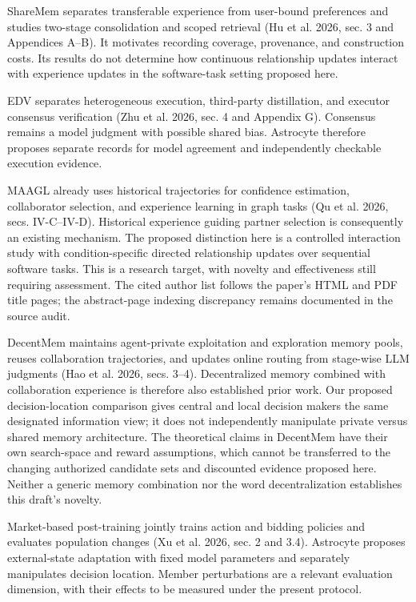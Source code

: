 \documentclass[
  english,
  11pt,
]{article}
\begin{document}
ShareMem separates transferable experience from user-bound preferences
and studies two-stage consolidation and scoped retrieval (Hu et al.
2026, sec. 3 and Appendices A--B). It motivates recording coverage,
provenance, and construction costs. Its results do not determine how
continuous relationship updates interact with experience updates in the
software-task setting proposed here.

EDV separates heterogeneous execution, third-party distillation, and
executor consensus verification (Zhu et al. 2026, sec. 4 and Appendix
G). Consensus remains a model judgment with possible shared bias.
Astrocyte therefore proposes separate records for model agreement and
independently checkable execution evidence.

MAAGL already uses historical trajectories for confidence estimation,
collaborator selection, and experience learning in graph tasks (Qu et
al. 2026, secs. IV-C--IV-D). Historical experience guiding partner
selection is consequently an existing mechanism. The proposed
distinction here is a controlled interaction study with
condition-specific directed relationship updates over sequential
software tasks. This is a research target, with novelty and
effectiveness still requiring assessment. The cited author list follows
the paper's HTML and PDF title pages; the abstract-page indexing
discrepancy remains documented in the source audit.

DecentMem maintains agent-private exploitation and exploration memory
pools, reuses collaboration trajectories, and updates online routing
from stage-wise LLM judgments (Hao et al. 2026, secs. 3--4).
Decentralized memory combined with collaboration experience is therefore
also established prior work. Our proposed decision-location comparison
gives central and local decision makers the same designated information
view; it does not independently manipulate private versus shared memory
architecture. The theoretical claims in DecentMem have their own
search-space and reward assumptions, which cannot be transferred to the
changing authorized candidate sets and discounted evidence proposed
here. Neither a generic memory combination nor the word decentralization
establishes this draft's novelty.

Market-based post-training jointly trains action and bidding policies
and evaluates population changes (Xu et al. 2026, sec. 2 and 3.4).
Astrocyte proposes external-state adaptation with fixed model parameters
and separately manipulates decision location. Member perturbations are a
relevant evaluation dimension, with their effects to be measured under
the present protocol.
\end{document}
